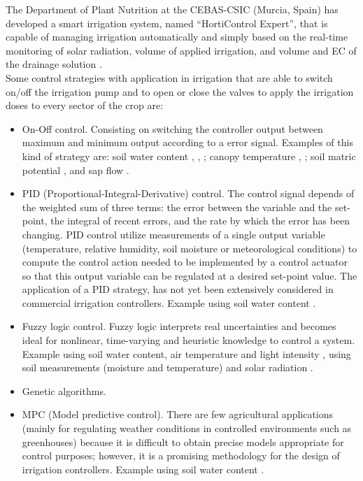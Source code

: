 \documentclass[letterpaper, 10 pt, conference]{ieeeconf}  %
\begin{document}
The Department of Plant Nutrition at the CEBAS-CSIC (Murcia, Spain) has developed a smart irrigation system, named “HortiControl Expert”, that is capable of managing irrigation automatically and simply based on the real-time monitoring of solar radiation, volume of applied irrigation, and volume and EC of the drainage solution  \cite{Rodriguez-Ortega2017}. \\




Some control strategies with application in irrigation that are able to switch on/off the irrigation pump and to open or close the valves to apply the irrigation doses to every sector of the crop are: 

\begin{itemize}
\item On-Off control. Consisting on switching the controller output between maximum and minimum output according to a error signal. Examples of this kind of strategy are: soil water content \cite{boutraa2011evaluation}, \cite{cardenas2010sensor}, \cite{miranda2005autonomous}; canopy temperature \cite{o2010canopy}, \cite{peters2008automation}; soil matric potential \cite{caceres2007adaptation}, \cite{romero2008automatic} and sap flow \cite{fernandez2008design}.
\item PID (Proportional-Integral-Derivative) control. The control signal depends of the weighted sum of three terms: the error between the variable and the set-point, the integral of recent errors, and the rate by which the error has been changing. PID control utilize measurements of a single output variable (temperature, relative humidity, soil moisture or meteorological conditions) to compute the control action needed to be implemented by a control actuator so that this output variable can be regulated at a desired set-point value. The application of a PID strategy, has not yet been extensively considered in commercial irrigation controllers. Example using soil water content \cite{romero2011hydraulic}. 
\item Fuzzy logic control. Fuzzy logic interprets real uncertainties and becomes ideal for nonlinear, time-varying and heuristic knowledge to control a system. Example using soil water content, air temperature and light intensity \cite{xiang2010design}, using soil measurements (moisture and temperature) and solar radiation \cite{Touati2013}.
\item Genetic algorithms.
\item MPC (Model predictive control). There are few agricultural applications (mainly for regulating weather conditions in controlled environments such as greenhouses) because it is difficult to obtain precise models appropriate for control purposes; however, it is a promising methodology for the design of irrigation controllers. Example using soil water content \cite{romero2011hydraulic}.

\end{itemize}
\end{document}
